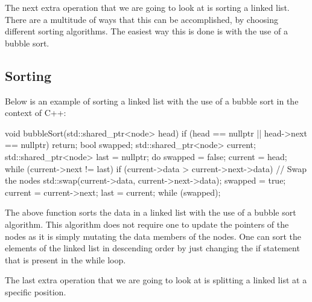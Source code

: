 The next extra operation that we are going to look at is sorting a linked list. There are a multitude of ways that this can be accomplished, by choosing different sorting algorithms. The easiest way
this is done is with the use of a bubble sort.

\begin{highlight}

\subsection*{Sorting}

Below is an example of sorting a linked list with the use of a bubble sort in the context of C++:

\begin{code}
void bubbleSort(std::shared_ptr<node> head) {
    if (head == nullptr || head->next == nullptr) {
        return;
    }
    bool swapped;
    std::shared_ptr<node> current;
    std::shared_ptr<node> last = nullptr;
    do {
        swapped = false;
        current = head;
        while (current->next != last) {
            if (current->data > current->next->data) {
                // Swap the nodes
                std::swap(current->data, current->next->data);
                swapped = true;
            }
            current = current->next;
        }
        last = current;
    } while (swapped);
}
\end{code}

The above function sorts the data in a linked list with the use of a bubble sort algorithm. This algorithm does not require one to update the pointers of the nodes as it is simply mutating the data
members of the nodes. One can sort the elements of the linked list in descending order by just changing the if statement that is present in the while loop.
    
\end{highlight}

The last extra operation that we are going to look at is splitting a linked list at a specific position.

